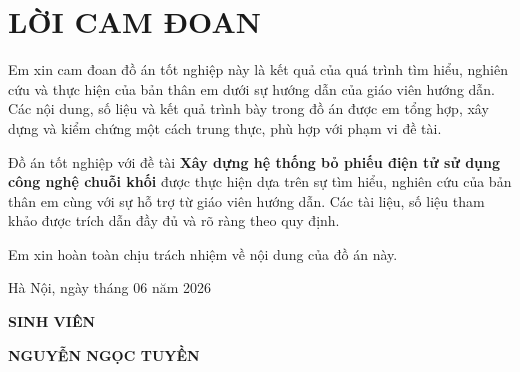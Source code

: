 \section*{LỜI CAM ĐOAN}

Em xin cam đoan đồ án tốt nghiệp này là kết quả của quá trình tìm hiểu, nghiên cứu và thực hiện của bản thân em dưới sự hướng dẫn của giáo viên hướng dẫn. Các nội dung, số liệu và kết quả trình bày trong đồ án được em tổng hợp, xây dựng và kiểm chứng một cách trung thực, phù hợp với phạm vi đề tài.

Đồ án tốt nghiệp với đề tài \textbf{Xây dựng hệ thống bỏ phiếu điện tử sử dụng công nghệ chuỗi khối} được thực hiện dựa trên sự tìm hiểu, nghiên cứu của bản thân em cùng với sự hỗ trợ từ giáo viên hướng dẫn. Các tài liệu, số liệu tham khảo được trích dẫn đầy đủ và rõ ràng theo quy định.

Em xin hoàn toàn chịu trách nhiệm về nội dung của đồ án này.

\vspace{6pt}
\hspace{7cm}Hà Nội, ngày \hspace{0.3cm} tháng 06 năm 2026

\hspace{9cm}\textbf{SINH VIÊN}

\vspace{2cm}
\hspace{7.5cm}\textbf{NGUYỄN NGỌC TUYỀN}

\clearpage
